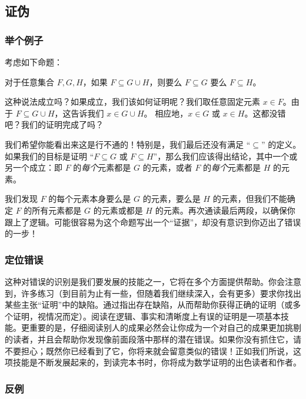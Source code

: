 \subsection{证伪}

\subsubsection*{举个例子}

考虑如下命题：
\begin{center}
    对于任意集合 $F, G, H$，如果 $F \subseteq G \cup H$，则要么 $F \subseteq G$ 要么 $F \subseteq H$。
\end{center}

这种说法成立吗？如果成立，我们该如何证明呢？我们取任意固定元素 $x \in F$。由于 $F \subseteq G \cup H$，这告诉我们 $x \in G \cup H$。 相应地，$x \in G$ 或 $x \in H$。这都没错吧？我们的证明完成了吗？

我们希望你能看出来这是行不通的！特别是，我们最后还没有满足 ``$\subseteq$'' 的定义。如果我们的目标是证明 ``$F \subseteq G$ 或 $F \subseteq H$''，那么我们应该得出结论，其中一个或另一个成立：即 $F$ 的\emph{每个}元素都是 $G$ 的元素，或者 $F$ 的\emph{每个}元素都是 $H$ 的元素。

我们发现 $F$ 的每个元素本身要么是 $G$ 的元素，要么是 $H$ 的元素，但我们不能确定 $F$ 的所有元素都是 $G$ 的元素或都是 $H$ 的元素。再次通读最后两段，以确保你跟上了逻辑。可能很容易为这个命题写出一个``证据''，却没有意识到你迈出了错误的一步！

\subsubsection*{定位错误}

这种对错误的识别是我们要发展的技能之一，它将在多个方面提供帮助。你会注意到，许多练习（到目前为止有一些，但随着我们继续深入，会有更多）要求你找出某些主张``证明''中的缺陷。通过指出存在缺陷，从而帮助你获得正确的证明（或多个证明，视情况而定）。阅读在逻辑、事实和清晰度上有误的证明是一项基本技能。更重要的是，仔细阅读别人的成果必然会让你成为一个对自己的成果更加挑剔的读者，并且会帮助你发现像前面段落中那样的潜在错误。如果你没有抓住它，请不要担心；既然你已经看到了它，你将来就会留意类似的错误！正如我们所说，这项技能是不断发展起来的，到读完本书时，你将成为数学证明的出色读者和作者。

\subsubsection*{反例}

